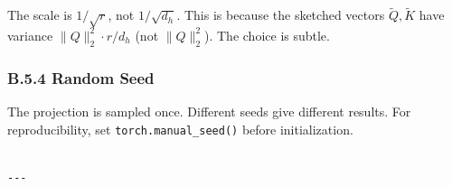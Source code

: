 The scale is $1/\sqrt{r}$, not $1/\sqrt{d_h}$. This is because the sketched 
vectors $\tilde{Q}, \tilde{K}$ have variance $\|Q\|_2^2 \cdot r / d_h$ (not 
$\|Q\|_2^2$). The choice is subtle.

\subsubsection{B.5.4 Random Seed}

The projection is sampled once. Different seeds give different results. 
For reproducibility, set \texttt{torch.manual\_seed()} before initialization.
\begin{lstlisting}

---
\end{lstlisting}